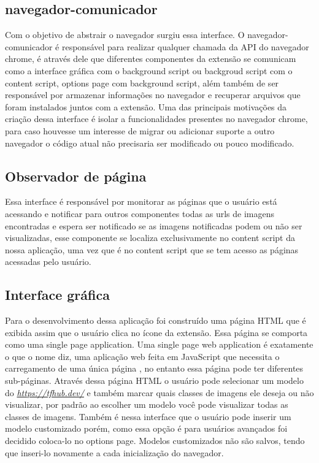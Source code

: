 \documentclass[conference]{IEEEtran}
\begin{document}
\subsection{navegador-comunicador}
Com o objetivo de abstrair o navegador surgiu essa interface. O navegador-comunicador é responsável para realizar qualquer chamada da API do navegador chrome, é através dele que diferentes componentes da extensão se comunicam como a interface gráfica com o background script ou backgroud script com o content script, options page com background script, além também de ser responsável por armazenar informações no navegador e recuperar arquivos que foram instalados juntos com a extensão. Uma das principais motivações da criação dessa interface é isolar a funcionalidades presentes no navegador chrome, para caso houvesse um interesse de migrar ou adicionar suporte a outro navegador o código atual não precisaria ser modificado ou pouco modificado.

\subsection{Observador de página}
Essa interface é responsável por monitorar as páginas que o usuário está acessando e notificar para outros componentes todas as urls de imagens encontradas e espera ser notificado se as imagens notificadas podem ou não ser visualizadas, esse componente se localiza exclusivamente no content script da nossa aplicação, uma vez que é no content script que se tem acesso as páginas acessadas pelo usuário.

\subsection{Interface gráfica}
Para o desenvolvimento dessa aplicação foi construído uma página HTML que é exibida assim que o usuário clica no ícone da extensão. Essa página se comporta como uma single page application. Uma single page web application é exatamente o que o nome diz, uma aplicação web feita em JavaScript que necessita o carregamento de uma única página \cite{flanagan1998java}, no entanto essa página pode ter diferentes sub-páginas. Através dessa página HTML o usuário pode selecionar um modelo do \textit{\url{https://tfhub.dev/}} e também marcar quais classes de imagens ele deseja ou não visualizar, por padrão ao escolher um modelo você pode visualizar todas as classes de imagens. Também é nessa interface que o usuário pode inserir um modelo customizado porém, como essa opção é para usuários avançados foi decidido coloca-lo no options page. Modelos customizados não são salvos, tendo que inseri-lo novamente a cada inicialização do navegador.
\end{document}
